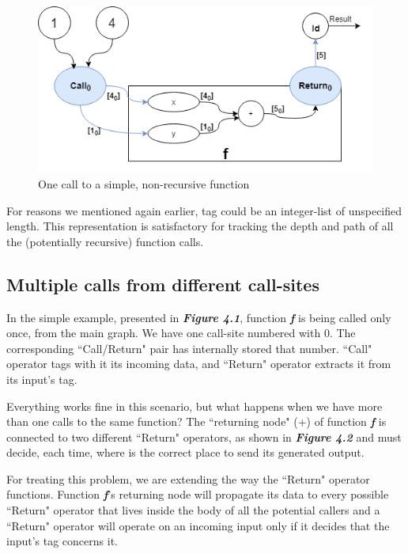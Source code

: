 \documentclass[ack,preface]{dithesis}
\begin{document}
\begin{figure}
\centering
\includegraphics[scale=0.65]{figures/Example1}
\caption{One call to a simple, non-recursive function}
\end{figure}

For reasons we mentioned again earlier, tag could be an integer-list of unspecified length. This representation is satisfactory for tracking the depth and path of all the (potentially recursive) function calls.

\subsection{Multiple calls from different call-sites}
In the simple example, presented in \textit{\textbf{Figure 4.1}}, function \textit{\textbf{f}} is being called only once, from the main graph. We have one call-site numbered with 0. The corresponding ``Call/Return" pair has internally stored that number. ``Call" operator tags with it its incoming data, and ``Return" operator extracts it from its input's tag. 

Everything works fine in this scenario, but what happens when we have more than one calls to the same function? 
The ``returning node" (+) of function  \textit{\textbf{f}} is connected to  two different ``Return" operators, as shown in \textit{\textbf{Figure 4.2}} and must decide, each time,  where is the correct place to send its generated output.

For treating this problem, we are extending the way the ``Return" operator functions.  Function \textit{\textbf{f}}'s returning node will  propagate its data to every possible ``Return" operator that lives inside the body of all the potential callers and a ``Return" operator will operate on an incoming input only if it decides that the input's tag concerns it.
\end{document}
